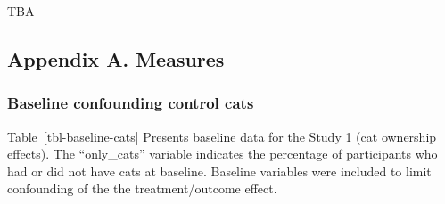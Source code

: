 \documentclass[
  singlecolumn,
  9pt]{article}
\begin{document}
TBA

\newpage{}

\subsection{Appendix A. Measures}\label{appendix-a.-measures}

\subsubsection{Baseline confounding control
cats}\label{baseline-confounding-control-cats}

Table~\ref{tbl-baseline-cats} Presents baseline data for the Study 1
(cat ownership effects). The ``only\_cats'' variable indicates the
percentage of participants who had or did not have cats at baseline.
Baseline variables were included to limit confounding of the the
treatment/outcome effect.
\end{document}
